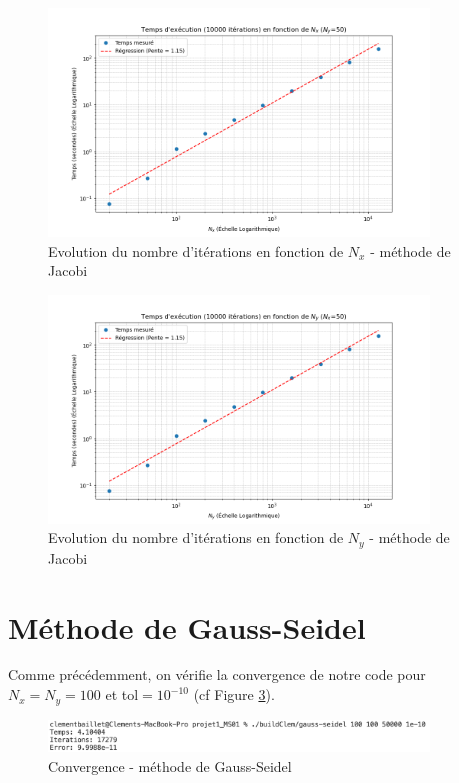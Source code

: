 \documentclass{article}
\begin{document}
\begin{figure}[H]
    \centering
    \includegraphics[width=0.9\textwidth]{courbe_log_log_jacobi.png}
    \caption{Evolution du nombre d'itérations en fonction de $N_x$ - méthode de Jacobi}
    \label{fig:loglogJacNx}
\end{figure}

\begin{figure}[H]
    \centering
    \includegraphics[width=0.9\textwidth]{courbe_log_log_jacobi_Ny.png}
    \caption{Evolution du nombre d'itérations en fonction de $N_y$ - méthode de Jacobi}
    \label{fig:loglogJacNy}
\end{figure}

\section{Méthode de Gauss-Seidel}

Comme précédemment, on vérifie la convergence de notre code pour $N_x = N_y = 100$ et tol$=10^{-10}$ (cf Figure \ref{fig:cvGS}).

\begin{figure}[H]
    \centering
    \includegraphics[width=0.9\textwidth]{cvGS}
    \caption{Convergence - méthode de Gauss-Seidel}
    \label{fig:cvGS}
\end{figure}
\end{document}
